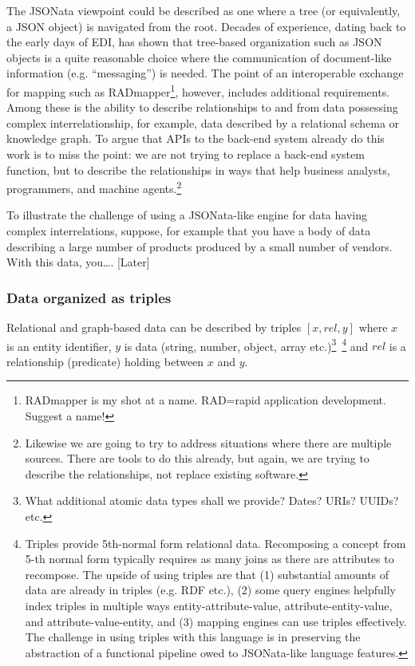 \documentclass[9pt,letterpaper]{article}
\begin{document}
The JSONata viewpoint could be described as one where a tree (or equivalently, a JSON object) is navigated from the root.
Decades of experience, dating back to the early days of EDI, has shown that tree-based organization such as JSON objects is a quite reasonable choice where the communication of document-like information (e.g. ``messaging'') is needed.
The point of an interoperable exchange for mapping such as RADmapper\footnote{RADmapper is my shot at a name. RAD=rapid application development. Suggest a name!}, however, includes additional requirements.
Among these is the ability to describe relationships to and from data possessing complex interrelationship, for example, data described by a relational schema or knowledge graph. 
To argue that APIs to the back-end system already do this work is to miss the point:
we are not trying to replace a back-end system function, but to describe the relationships in ways that help business analysts, programmers, and machine agents.\footnote{Likewise we are going to try to address
  situations where there are multiple sources. There are tools to do this already, but again, we are trying to describe the relationships, not replace existing software.}

To illustrate the challenge of using a JSONata-like engine for data having complex interrelations, suppose, for example that you have a body of data describing a large number of products produced by a small number of vendors.
With this data, you\ldots. [Later]

\subsubsection{Data organized as triples}
Relational and graph-based data can be described by triples $[x,rel,y]$ where $x$ is an entity identifier, $y$ is data (string, number, object, array etc.)\footnote{What  additional atomic data
  types shall we provide? Dates? URIs? UUIDs? etc.}~\footnote{Triples provide 5th-normal form relational data. Recomposing a concept from 5-th normal form typically requires as many joins as
  there are attributes to recompose.
  The upside of using triples are that
  (1) substantial amounts of data are already in triples (e.g. RDF etc.),
  (2) some query engines helpfully index triples in multiple ways entity-attribute-value, attribute-entity-value, and attribute-value-entity, and
  (3) mapping engines can use triples effectively.
  The challenge in using triples with this language is in preserving the abstraction of a functional pipeline owed to JSONata-like language features.}
  and $rel$ is a relationship (predicate) holding between $x$ and $y$.
  
\end{document}
